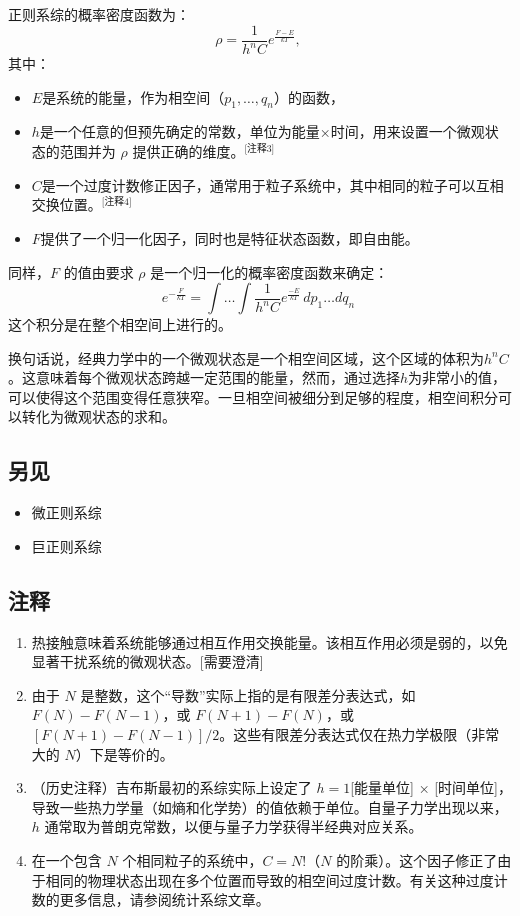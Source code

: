 正则系综的概率密度函数为：
\[
\rho = \frac{1}{h^n C} e^{\frac{F - E}{kT}},~
\]
其中：
\begin{itemize}
\item \( E \)是系统的能量，作为相空间（\( p_1, \dots, q_n \)）的函数，
\item \( h \)是一个任意的但预先确定的常数，单位为能量×时间，用来设置一个微观状态的范围并为 \( \rho \) 提供正确的维度。\(^\text{[注释3]}\)
\item \( C \)是一个过度计数修正因子，通常用于粒子系统中，其中相同的粒子可以互相交换位置。\(^\text{[注释4]}\)
\item \( F \)提供了一个归一化因子，同时也是特征状态函数，即自由能。
\end{itemize}
同样，\( F \) 的值由要求 \( \rho \) 是一个归一化的概率密度函数来确定：
\[
e^{- \frac{F}{kT}} = \int \ldots \int \frac{1}{h^n C} e^{\frac{-E}{kT}} \, dp_1 \ldots dq_n~
\]
这个积分是在整个相空间上进行的。

换句话说，经典力学中的一个微观状态是一个相空间区域，这个区域的体积为\( h^n C \)。这意味着每个微观状态跨越一定范围的能量，然而，通过选择\( h \)为非常小的值，可以使得这个范围变得任意狭窄。一旦相空间被细分到足够的程度，相空间积分可以转化为微观状态的求和。
\subsection{另见}  
\begin{itemize}
\item 微正则系综  
\item 巨正则系综
\end{itemize}  
\subsection{注释 } 
\begin{enumerate}
\item 热接触意味着系统能够通过相互作用交换能量。该相互作用必须是弱的，以免显著干扰系统的微观状态。[需要澄清]
\item 由于 \( N \) 是整数，这个“导数”实际上指的是有限差分表达式，如 \( F(N) - F(N - 1) \)，或 \( F(N + 1) - F(N) \)，或 \( [F(N + 1) - F(N - 1)] / 2 \)。这些有限差分表达式仅在热力学极限（非常大的 \( N \)）下是等价的。
\item （历史注释）吉布斯最初的系综实际上设定了 \( h = 1 \)[能量单位] × [时间单位]，导致一些热力学量（如熵和化学势）的值依赖于单位。自量子力学出现以来，\( h \) 通常取为普朗克常数，以便与量子力学获得半经典对应关系。
\item 在一个包含 \( N \) 个相同粒子的系统中，\( C = N! \)（\( N \) 的阶乘）。这个因子修正了由于相同的物理状态出现在多个位置而导致的相空间过度计数。有关这种过度计数的更多信息，请参阅统计系综文章。
\end{enumerate}
